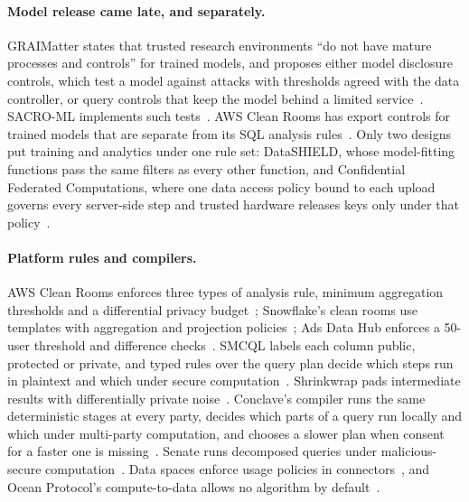 \paragraph{Model release came late, and separately.} GRAIMatter states that
trusted research environments ``do not have mature processes and controls'' for
trained models, and proposes either model disclosure controls, which test a
model against attacks with thresholds agreed with the data controller, or
query controls that keep the model behind a limited
service~\citep{jefferson2022graimatter,mansouribenssassi2021machine}.
SACRO-ML implements such tests~\citep{smith2022safe}. AWS Clean Rooms has
export controls for trained models that are separate from its SQL analysis
rules~\citep{aws2026mlexport,aws2026analysisrules}. Only two designs put
training and analytics under one rule set: DataSHIELD, whose model-fitting
functions pass the same filters as every other function, and Confidential
Federated Computations, where one data access policy bound to each upload
governs every server-side step and trusted hardware releases keys only under
that policy~\citep{eichner2024confidential}.

\paragraph{Platform rules and compilers.} AWS Clean Rooms enforces three types
of analysis rule, minimum aggregation thresholds and a differential privacy
budget~\citep{aws2026analysisrules,aws2026minagg,aws2026dp}; Snowflake's clean
rooms use templates with aggregation and projection
policies~\citep{snowflake2026policies}; Ads Data Hub enforces a 50-user
threshold and difference checks~\citep{google2026adh}. SMCQL labels each column
public, protected or private, and typed rules over the query plan decide which
steps run in plaintext and which under secure computation~\citep{bater2017smcql}.
Shrinkwrap pads intermediate results with differentially private
noise~\citep{bater2018shrinkwrap}. Conclave's compiler runs the same
deterministic stages at every party, decides which parts of a query run locally
and which under multi-party computation, and chooses a slower plan when consent
for a faster one is missing~\citep{volgushev2019conclave}. Senate runs
decomposed queries under malicious-secure computation~\citep{poddar2021senate}.
Data spaces enforce usage policies in connectors~\citep{ids2026ram,dam2023policy,edc2026policy},
and Ocean Protocol's compute-to-data allows no algorithm by
default~\citep{ocean2026c2d}.


